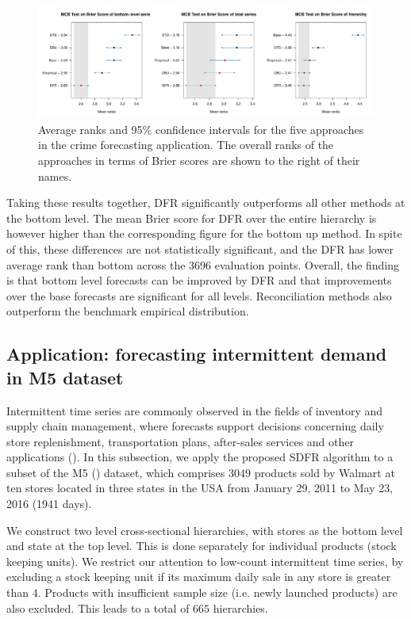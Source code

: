 \documentclass[a4paper,review,12pt,authoryear]{elsarticle}
\theoremstyle{definition}
\begin{document}
     \begin{figure}[h]
       \caption{\label{fig:application_crime}Average ranks and 95\% confidence intervals for the five approaches in the crime forecasting application. The overall ranks of the approaches in terms of Brier scores are shown to the right of their names.}
       \centering
       \includegraphics[width=\textwidth]{figures/dc_crime_mcb.pdf}
     \end{figure}


     Taking these results together, DFR significantly outperforms all other methods at the bottom level. The mean Brier score for DFR over the entire hierarchy is however higher than the corresponding figure for the bottom up method. In spite of this, these differences are not statistically significant, and the DFR has lower average rank than bottom across the 3696 evaluation points. Overall, the finding is that bottom level forecasts can be improved by DFR and that improvements over the base forecasts are significant for all levels. Reconciliation methods also outperform the benchmark empirical distribution.
     
     \subsection{Application: forecasting intermittent demand in M5 dataset}
     \label{sec:M5}

     Intermittent time series are commonly observed in the fields of inventory and supply chain management, where forecasts support decisions concerning daily store replenishment, transportation plans, after-sales services and other applications (\citealp{babaiDemandForecastingSupply2022}). In this subsection, we apply the proposed SDFR algorithm to a subset of the M5 (\citealp{makridakisM5AccuracyCompetition2022}) dataset, which comprises $3049$ products sold by Walmart at ten stores located in three states in the USA from January 29, 2011 to May 23, 2016 (1941 days).
     
     We construct two level cross-sectional hierarchies, with stores as the bottom level and state at the top level. This is done separately for individual products (stock keeping units). We restrict our attention to low-count intermittent time series, by excluding a stock keeping unit if its maximum daily sale in any store is greater than $4$. Products with insufficient sample size (i.e. newly launched products) are also excluded. This leads to a total of $665$ hierarchies.
     
\end{document}
